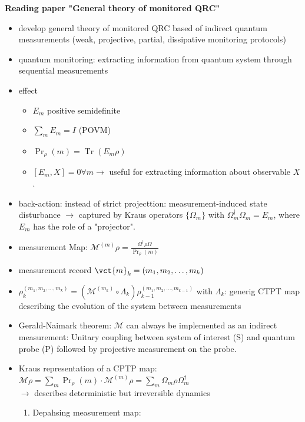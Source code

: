 \textbf{Reading paper "General theory of monitored QRC"}
\begin{itemize}
    \item develop general theory of monitored QRC based of indirect quantum measurements (weak, projective, partial, dissipative monitoring protocols)
    \item quantum monitoring: extracting information from quantum system through sequential measurements
    \item effect
    \begin{itemize}
        \item $E_m$ positive semidefinite 
        \item $\sum_m E_m = I$ (POVM) 
        \item $\operatorname{Pr}_\rho(m) = \operatorname{Tr}(E_m \rho)$
        \item $[E_m, X] = 0 \forall m \to$ useful for extracting information about observable $X$. 
    \end{itemize} 
    \item back-action: instead of strict projecttion: measurement-induced state disturbance $\to$ captured by Kraus operators $\{\Omega_m\}$ with $\Omega_m^\dagger \Omega_m = E_m$, where $E_m$ has the role of a "projector".
    \item measurement Map: $\mathcal{M}^{(m)}\rho = \frac{\Omega^\dagger \rho \Omega}{\operatorname{Pr}_\rho(m)}$
    \item measurement record $\vct{m}_{k} = (m_1, m_2, \ldots, m_k)$
    \item $\rho_k^{(m_1, m_2, \ldots, m_k)} = (\mathcal{M}^{(m_k)} \circ \Lambda_k) \rho_{k-1}^{(m_1, m_2, \ldots, m_{k-1})} $ with $\Lambda_k$: generig CTPT map describing the evolution of the system between measurements
    \item Gerald-Naimark theorem: $\mathcal{M}$ can always be implemented as an indirect measurement: Unitary coupling between system of interest (S) and quantum probe (P) followed by projective measurement on the probe. 
    \item Kraus representation of a CPTP map: \\ 
    $\mathcal{M}\rho = \sum_m \operatorname{Pr}_\rho (m) \cdot \mathcal{M}^{(m)}\rho = \sum_m \Omega_m \rho \Omega_m^\dagger $ \\
    $\to$ describes deterministic but irreversible dynamics
    \begin{enumerate}
        \item Depahsing measurement map: \\

\end{enumerate}
\end{itemize}
